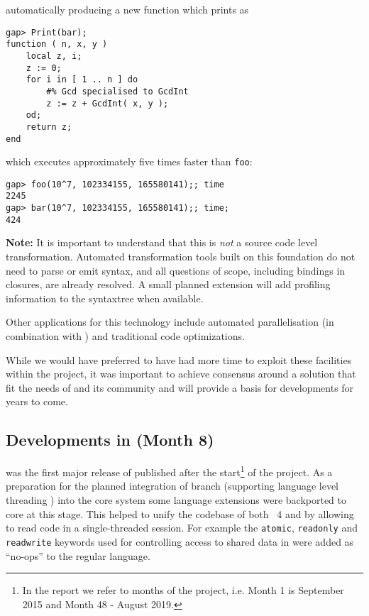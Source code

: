 automatically producing a new function which prints as

\begin{Small}
\begin{verbatim}
gap> Print(bar);
function ( n, x, y )
    local z, i;
    z := 0;
    for i in [ 1 .. n ] do
        #% Gcd specialised to GcdInt
        z := z + GcdInt( x, y );
    od;
    return z;
end
\end{verbatim}
\end{Small}

which executes approximately five times faster than \verb|foo|:
\begin{Small}
\begin{verbatim}
gap> foo(10^7, 102334155, 165580141);; time
2245
gap> bar(10^7, 102334155, 165580141);; time;
424
\end{verbatim}
\end{Small}

\textbf{Note:} It is important to understand that this is \emph{not} a
source code level transformation. Automated transformation tools built
on this foundation do
not need to parse or emit \GAP syntax, and all questions of scope,
including bindings in closures, are already resolved. A small planned
extension will add profiling information to the syntaxtree when available.

Other applications for this technology include automated
parallelisation (in combination with \HPCGAP) and traditional code optimizations.

While we would have preferred to have had more time to exploit these
facilities within the project, it was important to achieve consensus
around a solution that fit the needs of \GAP and its community and
will provide a basis for developments for years to come.

\subsection{Developments in  (Month 8)}\label{gap-4.8}


 was the first major release of \GAP published
after the start\footnote{In the report we
refer to months of the project, i.e. Month 1 is September 2015 and Month 48 - August 2019.}
of the \ODK project. 
As a preparation for the planned integration of \HPCGAP branch
(supporting \GAP language level threading ) into
the core system some language extensions were backported to core
\GAP at this stage. 
This helped to unify the codebase of both \GAP~4 and \HPCGAP
by allowing to read \HPCGAP code in a single-threaded
\GAP session. For example the
\verb|atomic|, \verb|readonly| and \verb|readwrite| keywords used for
controlling access to shared data in \HPCGAP were
added as ``no-ops'' to the regular \GAP language.


